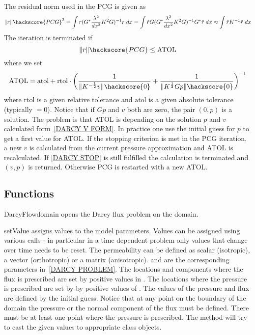 The residual norm used in the PCG is given as
\begin{equation}\label{DARCY R NORM}
\|r\|\hackscore{PCG}^2 = \int r (G^* \frac{\lambda^2}{dx^2} K^2 G)^{-1} r \; dx =\int \hat{r}  G ( G^* \frac{\lambda^2}{dx^2} K^2 G)^{-1}  G^* \hat{r} \; dx \approx
\int \hat{r} K^{-1}  \hat{r} \; dx 
\end{equation}
The iteration is terminated if 
\begin{equation}\label{DARCY STOP}
\|r\|\hackscore{PCG} \le \mbox{ATOL}
\end{equation}
where we set 
\begin{equation}\label{DARCY ATOL DEF}
\mbox{ATOL} = \mbox{atol} + \mbox{rtol} \cdot \left(\frac{1}{\|K^{-\frac{1}{2}}v\|\hackscore{0}} + \frac{1}{\|K^{\frac{1}{2}} G p\|\hackscore{0}} \right)^{-1} 
\end{equation}
where rtol is a given relative tolerance and $\mbox{atol}$ is a given absolute tolerance (typically $=0$).  
Notice that if $Gp$ and $v$ both are zero, the pair $(0,p)$ is a solution.
The problem is that ATOL is depending on the solution $p$ and $v$ calculated form~\ref{DARCY V FORM}. 
In practice one use the initial guess for $p$ 
to get a first value for ATOL. If the stopping criterion is met in the PCG iteration, a new $v$ is calculated from the current pressure approximation and ATOL is recalculated. If \ref{DARCY STOP} is still fulfilled the calculation is terminated and $(v,p)$ is returned. Otherwise PCG is restarted with a new ATOL.

\subsection{Functions}
\begin{classdesc}{DarcyFlow}{domain}
opens the Darcy flux problem on the \Domain domain.
\end{classdesc}

\begin{methoddesc}[DarcyFlow]{setValue}{}
assigns values to the model parameters. Values can be assigned using various calls - in particular 
in a time dependent problem only values that change over time needs to be reset. The permeability can be defined as scalar (isotropic), a vector (orthotropic) or a matrix (anisotropic). 
 and  are the corresponding parameters in~\ref{DARCY PROBLEM}.
The locations and components where the flux is prescribed are set by positive values in
. 
The locations where the pressure is prescribed are set by 
by positive values of . 
The values of the pressure and flux are defined by the initial guess.
Notice that at any point on the boundary of the domain the pressure or the normal component of
the flux must be defined. There must be at least one point where the pressure is prescribed. 
The method will try to cast the given values to appropriate 
\Data class objects.
\end{methoddesc}

